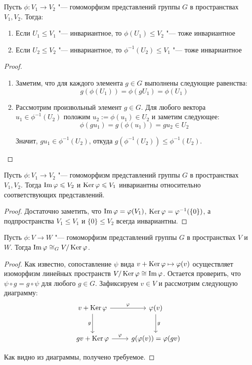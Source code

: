 \begin{proposition}
	Пусть $\phi: V_1 \to V_2$ "--- гомоморфизм представлений группы $G$ в пространствах $V_1, V_2$. Тогда:
	\begin{enumerate}
		\item Если $U_1 \le V_1$ "--- инвариантное, то $\phi(U_1) \le V_2$ "--- тоже инвариантное
		\item Если $U_2 \le V_2$ "--- инвариантное, то $\phi^{-1}(U_2) \le V_1$ "--- тоже инвариантное
	\end{enumerate}
\end{proposition}

\begin{proof}~
	\begin{enumerate}
		\item Заметим, что для каждого элемента $g \in G$ выполнены следующие равенства:
		\[g(\phi(U_1)) = \phi(gU_1) = \phi(U_1)\]
		\item Рассмотрим произвольный элемент $g \in G$. Для любого вектора $u_1 \in \phi^{-1}(U_2)$ положим $u_2 := \phi(u_1) \in U_2$ и заметим следующее:
		\[\phi(gu_1) = g(\phi(u_1)) = gu_2 \in U_2\]
		
		Значит, $gu_1 \in \phi^{-1}(U_2)$, откуда $g(\phi^{-1}(U_2)) \le \phi^{-1}(U_2)$.\qedhere
	\end{enumerate}
\end{proof}

\begin{corollary}
	Пусть $\phi: V_1 \to V_2$ "--- гомоморфизм представлений группы $G$ в пространствах $V_1, V_2$. Тогда $\operatorname{Im}\varphi \leqslant V_2$ и $\operatorname{Ker}\varphi \leqslant V_1$ инвариантны относительно соответствующих представлений.
\end{corollary}

\begin{proof}
	Достаточно заметить, что $\operatorname{Im}\varphi = \varphi(V_1)$, $\operatorname{Ker}\varphi = \varphi^{-1}(\{0\})$, а подпространства $V_1 \le V_1$ и $\{0\} \le V_2$ всегда инвариантны.
\end{proof}

\begin{theorem}
	Пусть $\phi: V \to W$ "--- гомоморфизм представлений группы $G$ в пространствах $V$ и $W$. Тогда $\operatorname{Im}\varphi \cong_G V / \operatorname{Ker}\varphi$.
\end{theorem}

\begin{proof}
	Как известно, сопоставление $\psi$ вида $v + \operatorname{Ker}\varphi \mapsto \varphi(v)$ осуществляет изоморфизм линейных пространств $V / \operatorname{Ker}\varphi \cong \operatorname{Im}\varphi$. Остается проверить, что $\psi \circ g = g \circ \psi$ для любого $g \in G$. Зафиксируем $v \in V$ и рассмотрим следующую диаграмму:
	\[
	\begin{tikzcd}[row sep = large]
		v + \ke\phi \arrow[swap]{d}{g} \arrow{r}{\phi} & \phi(v) \arrow{d}{g}\\
		gv + \ke\phi \arrow{r}{\phi} & g(\phi(v)) = \phi(gv)
	\end{tikzcd}
	\]
	
	Как видно из диаграммы, получено требуемое.
\end{proof}

